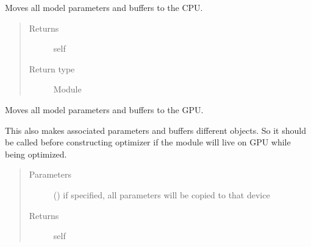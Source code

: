 \documentclass[letterpaper,10pt,english]{sphinxmanual}
\begin{document}
\begin{fulllineitems}
\begin{fulllineitems}
\begin{quote}
\begin{description}
\end{description}\end{quote}

\end{fulllineitems}


\begin{fulllineitems}
\label{\detokenize{api/dynamics:geology.metamodelling.dynamics.LatentSpaceDynamics.cpu}}
Moves all model parameters and buffers to the CPU.
\begin{quote}\begin{description}
\item[{Returns}] \leavevmode
self

\item[{Return type}] \leavevmode
Module

\end{description}\end{quote}

\end{fulllineitems}


\begin{fulllineitems}
\label{\detokenize{api/dynamics:geology.metamodelling.dynamics.LatentSpaceDynamics.cuda}}
Moves all model parameters and buffers to the GPU.

This also makes associated parameters and buffers different objects. So
it should be called before constructing optimizer if the module will
live on GPU while being optimized.
\begin{quote}\begin{description}
\item[{Parameters}] \leavevmode
{} (\sphinxstyleliteralemphasis{\sphinxupquote{, }}) \textendash{} if specified, all parameters will be
copied to that device

\item[{Returns}] \leavevmode
self


\end{description}
\end{quote}
\end{fulllineitems}
\end{fulllineitems}
\end{document}
